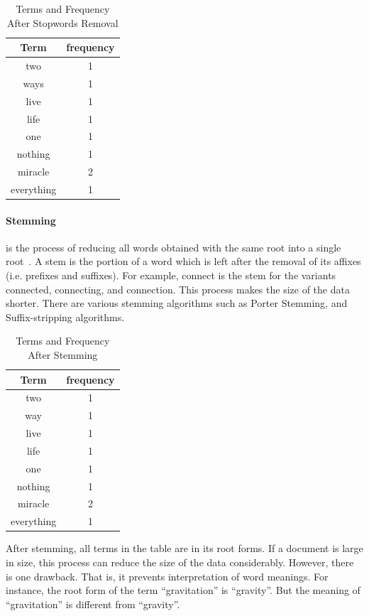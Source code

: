 \begin{table}
\centering
\begin{tabular}{|c|c|}
\hline \textbf{Term} & \textbf{frequency} \\
\hline two & 1 \\
\hline ways & 1 \\
\hline live & 1 \\
\hline life & 1 \\
\hline one & 1 \\
\hline nothing & 1 \\
\hline miracle & 2 \\
\hline everything & 1 \\  
\hline
\end{tabular}
\caption{Terms and Frequency After Stopwords Removal} \label{table:stopwordsremoval}
\end{table}

\paragraph{Stemming} is the process of reducing all words obtained with the same root into a single root~\cite[P. 20]{IRarchitecture}. 
A stem is the portion of a word which is left after
the removal of its affixes (i.e. prefixes and suffixes). For example, connect is the stem for the variants connected, connecting, and connection.
This process makes the size of the data shorter. There are various stemming algorithms such as Porter Stemming, and Suffix-stripping algorithms.

\begin{table}
\centering
\begin{tabular}{|c|c|}
\hline \textbf{Term} & \textbf{frequency} \\
\hline two & 1 \\
\hline way & 1 \\
\hline live & 1 \\
\hline life & 1 \\
\hline one & 1 \\
\hline nothing & 1 \\
\hline miracle & 2 \\
\hline everything & 1 \\  
\hline
\end{tabular}
\caption{Terms and Frequency After Stemming} \label{table:stemming}
\end{table}
After stemming, all terms in the table are in its root forms. If a document is large in size, this process can reduce the size of the data considerably. However, 
there is one drawback. That is, it prevents interpretation of word meanings. For instance, the root form of the term ``gravitation'' is ``gravity''. But
the meaning of ``gravitation'' is different from ``gravity''.

